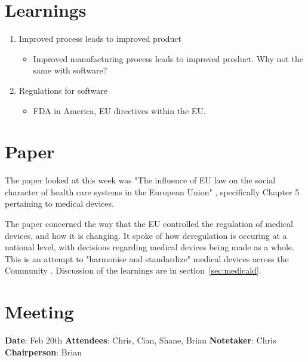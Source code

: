 \section{Learnings}
\begin{enumerate}
\item Improved process leads to improved product
\begin{itemize}
\item Improved manufacturing process leads to improved product. Why not the same with software?
\end{itemize}
\item Regulations for software
\begin{itemize}
\item FDA in America, EU directives within the EU.
\end{itemize}
\end{enumerate}

\section{Paper}

The paper looked at this week was "The influence of EU law on the social character of health care systems in the European Union"  \parencite{week3}, specifically Chapter 5 pertaining to medical devices. 

The paper concerned the way that the EU controlled the regulation of medical devices, and how it is changing. It spoke of how deregulation is occuring at a national level, with decisions regarding medical devices being made as a whole. This is an attempt to "harmonise and standardize" medical devices across the Community \parencite{week3}. Discussion of the learnings are in section~\ref{sec:medicald}.

\section{Meeting}

\textbf{Date}: Feb 20th\newline
\textbf{Attendees}: Chris, Cian, Shane, Brian\newline
\textbf{Notetaker}: Chris\newline
\textbf{Chairperson}: Brian\newline \newline

